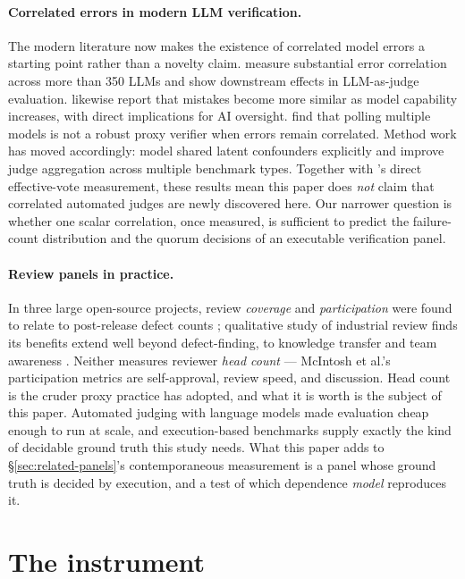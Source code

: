 \documentclass[11pt,a4paper]{article}
\begin{document}
\paragraph{Correlated errors in modern LLM verification.}
The modern literature now makes the existence of correlated model errors a
starting point rather than a novelty claim. \citet{kim2025correlated} measure
substantial error correlation across more than 350 LLMs and show downstream
effects in LLM-as-judge evaluation. \citet{goel2025great} likewise report that
mistakes become more similar as model capability increases, with direct
implications for AI oversight. \citet{denisov2026truthfulness} find that polling
multiple models is not a robust proxy verifier when errors remain correlated.
Method work has moved accordingly: \citet{zhao2026care} model shared latent
confounders explicitly and improve judge aggregation across multiple benchmark
types. Together with \citet{kohli2026}'s direct effective-vote measurement,
these results mean this paper does \emph{not} claim that correlated automated
judges are newly discovered here. Our narrower question is whether one scalar
correlation, once measured, is sufficient to predict the failure-count
distribution and the quorum decisions of an executable verification panel.

\paragraph{Review panels in practice.}
In three large open-source projects, review \emph{coverage} and
\emph{participation} were found to relate to post-release defect counts
\citep{mcintosh2014}; qualitative study of industrial review finds its benefits
extend well beyond defect-finding, to knowledge transfer and team awareness
\citep{bacchelli2013}. Neither measures reviewer \emph{head count} --- McIntosh
et al.'s participation metrics are self-approval, review speed, and discussion.
Head count is the cruder proxy practice has adopted, and what it is worth is the
subject of this paper. Automated judging with language models
\citep{zheng2023} made evaluation cheap enough to run at scale, and
execution-based benchmarks \citep{chen2021} supply exactly the kind of decidable
ground truth this study needs. What this paper adds to
\S\ref{sec:related-panels}'s contemporaneous measurement is a panel whose ground
truth is decided by execution, and a test of which dependence \emph{model}
reproduces it.

\section{The instrument}
\label{sec:instrument}
\end{document}
